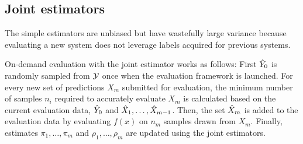 \subsection{Joint estimators}
The simple estimators are unbiased but have wastefully large variance
because evaluating a new system does not leverage labels acquired for previous
systems.  %

On-demand evaluation with the joint estimator works as follows:
First ${\hat{Y}}_0$ is randomly sampled from $\mathcal{Y}$ once when the evaluation framework is launched.
For every new set of predictions $X_m$ submitted for evaluation, the minimum number of samples $n_i$ required to accurately evaluate $X_m$ is calculated based on the current evaluation data, ${\hat{Y}}_0$ and ${\hat{X}}_1, \ldots, {\hat{X}}_{m-1}$.
Then, the set ${\hat{X}}_m$ is added to the evaluation data by evaluating $f(x)$ on $n_m$ samples drawn from $X_m$.
Finally, estimates $\pi_1, \ldots, \pi_m$ and $\rho_1, \ldots, \rho_m$ are updated using the joint estimators.

